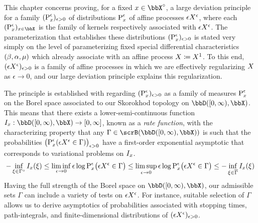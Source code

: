 This chapter concerns proving, for a fixed $\stateVar \in \stateSpace^\circ$, a large deviation principle for a family $({\operatorname{P}}^\epsilon_x)_{\epsilon>0}$ of distributions ${\operatorname{P}}^\epsilon_x$ of affine processes $\epsilon X^\epsilon$, where each $(\Prb^\epsilon_\stateVar)_{\stateVar\in\stateSpace}$ is the family of kernels respectively associated with $\epsilon X^\epsilon$.
The parameterization that establishes these distributions $({\operatorname{P}}^\epsilon_x)_{\epsilon>0}$ is stated very simply on the level of parameterizing fixed special differential characteristics $(\beta, \alpha, \mu)$ which already associate with an affine process $X \coloneqq X^1$.
To this end, $(\epsilon X^\epsilon)_{\epsilon>0}$ is a family of affine processes in which we are effectively regularizing $X$ as $\epsilon \rightarrow 0$, and our large deviation principle explains this regularization.

The principle is established with regarding $({\operatorname{P}}^\epsilon_x)_{\epsilon>0}$ as a family of measures ${\operatorname{P}}^\epsilon_x$ on the Borel space associated to our Skorokhod topology on $\pathSpace{[0,\infty)}{\stateSpace}$.
This means that there exists a lower-semi-continuous function $\rf_\stateVar: \pathSpace{[0,\infty)}{\stateSpace} \rightarrow [0,\infty]$, known as a \emph{rate function}, with the characterizing property that any $\Gamma \in \scrB(\pathSpace{[0,\infty)}{\stateSpace})$ is such that the probabilities $\big({\operatorname{P}}^\epsilon_x( \epsilon X^\epsilon \in \Gamma)\big)_{\epsilon>0}$
have a first-order exponential asymptotic that corresponds to variational problems on $I_x$.
\begin{equation*}
  -\inf_{\xi \in \Gamma^\circ} I_x(\xi) 
  \leq \liminf_{\epsilon\rightarrow0} \epsilon\log{\operatorname{P}}^\epsilon_x\big( \epsilon X^\epsilon \in \Gamma \big)
  \leq \limsup_{\epsilon\rightarrow0} \epsilon\log{\operatorname{P}}^\epsilon_x\big( \epsilon X^\epsilon \in \Gamma \big)
  \leq -\inf_{\xi \in \overline\Gamma} I_x(\xi) 
\end{equation*}
Having the full strength of the Borel space on $\pathSpace{[0,\infty)}{\stateSpace}$, our admissible sets $\Gamma$ can include a variety of tests on $\epsilon X^\epsilon$.
For instance, suitable selection of $\Gamma$ allows us to derive asymptotics of probabilities associated with stopping times, path-integrals, and finite-dimensional distributions of $(\epsilon X^\epsilon)_{\epsilon>0}$.

